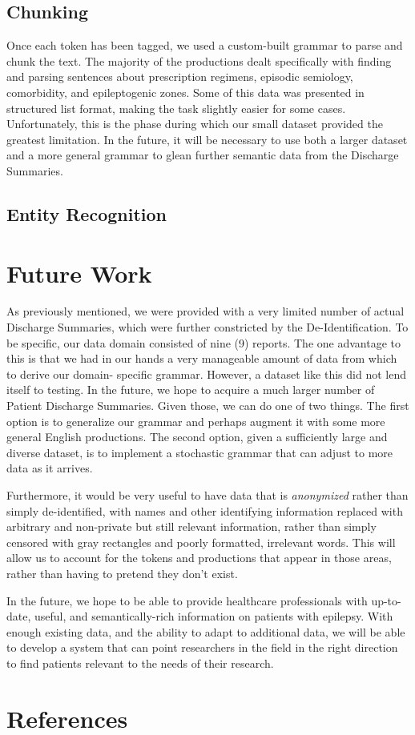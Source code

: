 \documentclass{acm_proc_article-sp}
\begin{document}
\subsection{Chunking}
Once each token has been tagged, we used a custom-built grammar to parse and chunk
the text. The majority of the productions dealt specifically with finding and parsing
sentences about prescription regimens, episodic semiology, comorbidity, and epileptogenic
zones. Some of this data was presented in structured list format, making the task
slightly easier for some cases. Unfortunately, this is the phase during which our
small dataset provided the greatest limitation. In the future, it will be necessary
to use both a larger dataset and a more general grammar to glean further semantic
data from the Discharge Summaries.
\subsection{Entity Recognition}
\section{Future Work}
As previously mentioned, we were provided with a very limited number of actual Discharge
Summaries, which were further constricted by the De-Identification. To be specific,
our data domain consisted of nine (9) reports. The one advantage to this is that we
had in our hands a very manageable amount of data from which to derive our domain-
specific grammar. However, a dataset like this did not lend itself to testing. In
the future, we hope to acquire a much larger number of Patient Discharge Summaries.
Given those, we can do one of two things. The first option is to generalize our grammar
and perhaps augment it with some more general English productions. The second option,
given a sufficiently large and diverse dataset, is to implement a stochastic grammar
that can adjust to more data as it arrives.

Furthermore, it would be very useful to have data that is \emph{anonymized} rather
than simply de-identified, with names and other identifying information replaced
with arbitrary and non-private but still relevant information, rather than simply
censored with gray rectangles and poorly formatted, irrelevant words. This will allow
us to account for the tokens and productions that appear in those areas, rather than
having to pretend they don't exist.

In the future, we hope to be able to provide healthcare professionals with up-to-date,
useful, and semantically-rich information on patients with epilepsy. With enough
existing data, and the ability to adapt to additional data, we will be able to develop
a system that can point researchers in the field in the right direction to find patients
relevant to the needs of their research.
\section{References}
{}

\end{document}

